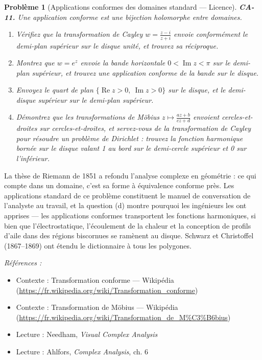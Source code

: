\documentclass[11pt]{article}
\newtheorem{problem}{Problème}
\newenvironment{refs}{\par\small\noindent\emph{Références :}\begin{itemize}\setlength\itemsep{0pt}}{\end{itemize}\normalsize}
\begin{document}
\begin{problem}[{Applications conformes des domaines standard --- Licence}]
\textbf{CA-11.} Une application conforme est une bijection holomorphe entre
domaines.
\begin{enumerate}
\item[(a)] Vérifiez que la transformation de Cayley $ w = \frac{z - i}{z + i} $ envoie conformément le
demi-plan supérieur sur le disque unité, et trouvez sa réciproque.
\item[(b)] Montrez que $ w = e^z $
envoie la bande horizontale $ 0 < \operatorname{Im} z < \pi $ sur le demi-plan supérieur,
et trouvez une application conforme de la bande sur le disque.
\item[(c)] Envoyez le quart de plan
$ \{ \operatorname{Re} z > 0,\ \operatorname{Im} z > 0 \} $ sur le disque, et le
demi-disque supérieur sur le demi-plan supérieur.
\item[(d)] Démontrez que les transformations de Möbius
$ z \mapsto \frac{az + b}{cz + d} $ envoient cercles-et-droites sur cercles-et-droites, et servez-vous
de la transformation de Cayley pour résoudre un problème de Dirichlet : trouvez la fonction
harmonique bornée sur le disque valant 1 au bord sur le demi-cercle supérieur et 0 sur
l'inférieur.
\end{enumerate}

\end{problem}

\noindent La thèse de Riemann de 1851 a refondu l'analyse complexe en géométrie : ce qui
compte dans un domaine, c'est sa forme à équivalence conforme près. Les applications standard de ce
problème constituent le manuel de conversation de l'analyste au travail, et la question (d) montre
pourquoi les ingénieurs les ont apprises --- les applications conformes transportent les fonctions
harmoniques, si bien que l'électrostatique, l'écoulement de la chaleur et la conception de profils
d'aile dans des régions biscornues se ramènent au disque. Schwarz et Christoffel (1867--1869) ont
étendu le dictionnaire à tous les polygones.

\begin{refs}
\item Contexte : Transformation conforme --- Wikipédia (\url{https://fr.wikipedia.org/wiki/Transformation_conforme})
\item Contexte : Transformation de Möbius --- Wikipédia (\url{https://fr.wikipedia.org/wiki/Transformation_de_M%C3%B6bius})
\item Lecture : Needham, \textit{Visual Complex Analysis}
\item Lecture : Ahlfors, \textit{Complex Analysis}, ch. 6
\end{refs}
\end{document}
